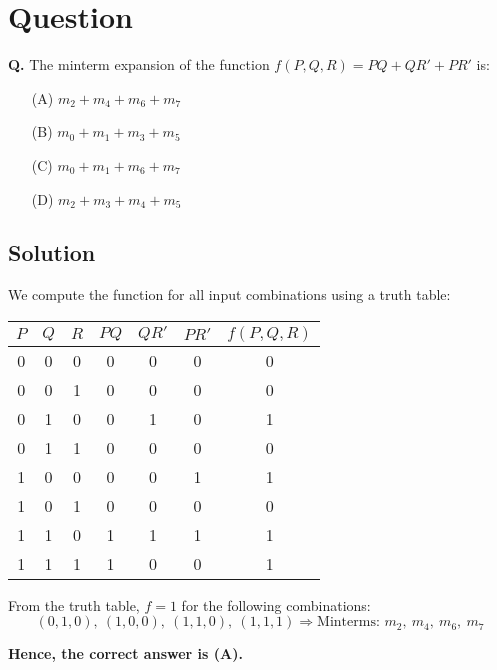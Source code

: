 \documentclass{article}
\begin{document}
\section*{Question}

\textbf{Q.} The minterm expansion of the function $f(P, Q, R) = PQ + QR' + PR'$ is:

\begin{itemize}
  \item[(A)] $m_2 + m_4 + m_6 + m_7$
  \item[(B)] $m_0 + m_1 + m_3 + m_5$
  \item[(C)] $m_0 + m_1 + m_6 + m_7$
  \item[(D)] $m_2 + m_3 + m_4 + m_5$
\end{itemize}

\subsection*{Solution}

We compute the function for all input combinations using a truth table:

\begin{center}
\begin{tabular}{ccc|c|c|c|c}
\toprule
$P$ & $Q$ & $R$ & $PQ$ & $QR'$ & $PR'$ & $f(P, Q, R)$ \\
\midrule
0 & 0 & 0 & 0 & 0 & 0 & 0 \\
0 & 0 & 1 & 0 & 0 & 0 & 0 \\
0 & 1 & 0 & 0 & 1 & 0 & 1 \\
0 & 1 & 1 & 0 & 0 & 0 & 0 \\
1 & 0 & 0 & 0 & 0 & 1 & 1 \\
1 & 0 & 1 & 0 & 0 & 0 & 0 \\
1 & 1 & 0 & 1 & 1 & 1 & 1 \\
1 & 1 & 1 & 1 & 0 & 0 & 1 \\
\bottomrule
\end{tabular}
\end{center}

From the truth table, $f = 1$ for the following combinations:
\[
(0,1,0),\ (1,0,0),\ (1,1,0),\ (1,1,1)
\Rightarrow \text{Minterms: } m_2,\ m_4,\ m_6,\ m_7
\]

\textbf{Hence, the correct answer is (A).}
\end{document}
